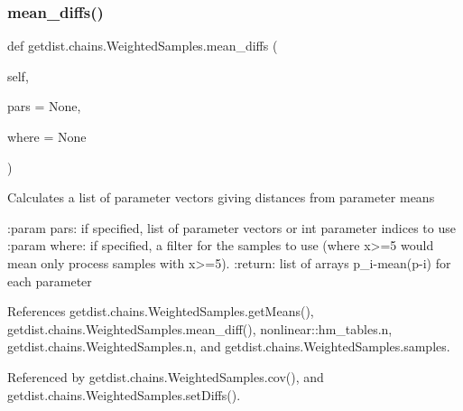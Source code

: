 \subsubsection{\texorpdfstring{mean\+\_\+diffs()}{mean\_diffs()}}
{\footnotesize\ttfamily def getdist.\+chains.\+Weighted\+Samples.\+mean\+\_\+diffs (\begin{DoxyParamCaption}\item[{}]{self,  }\item[{}]{pars = {\ttfamily None},  }\item[{}]{where = {\ttfamily None} }\end{DoxyParamCaption})}

\begin{DoxyVerb}Calculates a list of parameter vectors giving distances from parameter means

:param pars: if specified, list of parameter vectors or int parameter indices to use
:param where: if specified, a filter for the samples to use (where x>=5 would mean only process samples with x>=5).
:return: list of arrays p_i-mean(p-i) for each parameter
\end{DoxyVerb}
 

References getdist.\+chains.\+Weighted\+Samples.\+get\+Means(), getdist.\+chains.\+Weighted\+Samples.\+mean\+\_\+diff(), nonlinear\+::hm\+\_\+tables.\+n, getdist.\+chains.\+Weighted\+Samples.\+n, and getdist.\+chains.\+Weighted\+Samples.\+samples.



Referenced by getdist.\+chains.\+Weighted\+Samples.\+cov(), and getdist.\+chains.\+Weighted\+Samples.\+set\+Diffs().

